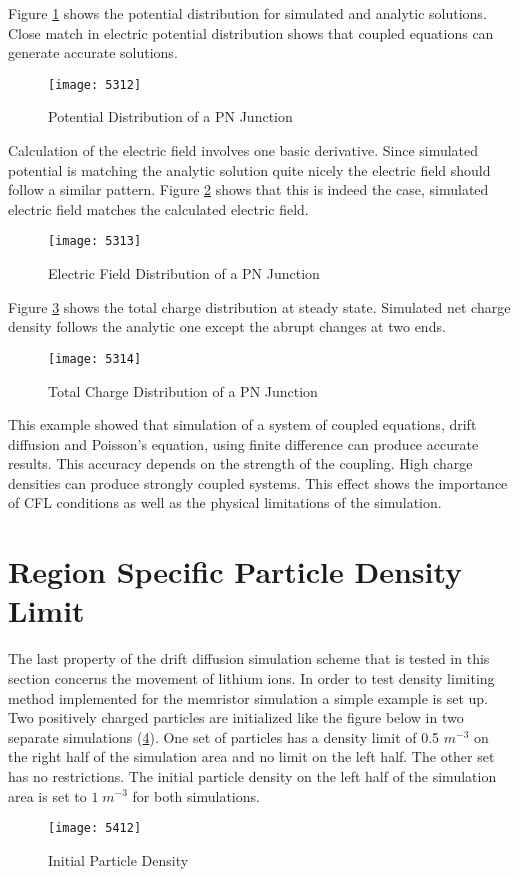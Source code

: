 \begin{doublespace}
 Figure \ref{pnpot} shows the potential distribution for simulated and analytic solutions. Close match in electric potential distribution shows that coupled equations can generate accurate solutions.
 
\begin{figure}[!htp]
\centering
\texttt{[image: 5312]}
\caption{Potential Distribution of a PN Junction} 
\label{pnpot}
\end{figure}

Calculation of the electric field involves one basic derivative. Since simulated potential is matching the analytic solution quite nicely the electric field should follow a similar pattern. Figure \ref{pnefield} shows that this is indeed the case, simulated electric field matches the calculated electric field.
\begin{figure}[!htp]
\centering
\texttt{[image: 5313]}
\caption{Electric Field Distribution of a PN Junction} 
\label{pnefield}
\end{figure}

Figure \ref{pncd} shows the total charge distribution at steady state. Simulated net charge density follows the analytic one except the abrupt changes at two ends. 
\begin{figure}
\centering
\texttt{[image: 5314]}
\caption{Total Charge Distribution of a PN Junction} 
\label{pncd}
\end{figure}

This example showed that simulation of a system of coupled equations, drift diffusion and Poisson's equation, using finite difference can produce accurate results. This accuracy depends on the strength of the coupling. High charge densities can produce strongly coupled systems. This effect shows the importance of CFL conditions as well as the physical limitations of the simulation.


\clearpage
\section{Region Specific Particle Density Limit}

The last property of the drift diffusion simulation scheme that is tested in this section concerns the movement of lithium ions. In order to test density limiting method implemented for the memristor simulation a simple example is set up. Two positively charged particles are initialized like the figure below in two separate simulations (\ref{5412}). One set of particles has a density limit of 0.5 $m^{-3}$ on the right half of the simulation area and no limit on the left half. The other set has no restrictions. The initial particle density on the left half of the simulation area is set to $1 \; m^{-3}$ for both simulations.
\begin{figure}[!htp]
\centering
\texttt{[image: 5412]}
\caption{Initial Particle Density} 
\label{5412}
\end{figure}


\end{doublespace}
